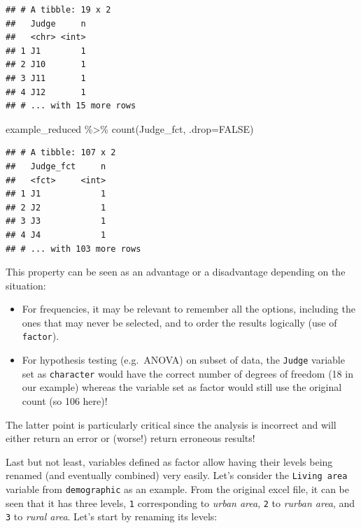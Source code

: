 \documentclass[
]{krantz}
\makeatletter
\newenvironment{Shaded}{\begin{snugshade}}{\end{snugshade}}
\newcommand{\AttributeTok}[1]{\textcolor[rgb]{0.61,0.61,0.61}{#1}}
\newcommand{\ConstantTok}[1]{\textcolor[rgb]{0,0,0}{#1}}
\newcommand{\FunctionTok}[1]{\textcolor[rgb]{0,0,0}{#1}}
\newcommand{\NormalTok}[1]{#1}
\newcommand{\SpecialCharTok}[1]{\textcolor[rgb]{0,0,0}{#1}}
\providecommand{\tightlist}{%
  \setlength{\itemsep}{0pt}\setlength{\parskip}{0pt}}
\newenvironment{kframe}{%
\medskip{}
\setlength{\fboxsep}{.8em}
 \def\at@end@of@kframe{}%
 \ifinner\ifhmode%
  \def\at@end@of@kframe{\end{minipage}}%
  \begin{minipage}{\columnwidth}%
 \fi\fi%
 \def\FrameCommand##1{\hskip\@totalleftmargin \hskip-\fboxsep
 \colorbox{shadecolor}{##1}\hskip-\fboxsep
     \hskip-\linewidth \hskip-\@totalleftmargin \hskip\columnwidth}%
 \MakeFramed {\advance\hsize-\width
   \@totalleftmargin\z@ \linewidth\hsize
   \@setminipage}}%
 {\par\unskip\endMakeFramed%
 \at@end@of@kframe}
\renewenvironment{Shaded}{\begin{kframe}}{\end{kframe}}
\makeatother
\begin{document}
\begin{verbatim}
## # A tibble: 19 x 2
##   Judge     n
##   <chr> <int>
## 1 J1        1
## 2 J10       1
## 3 J11       1
## 4 J12       1
## # ... with 15 more rows
\end{verbatim}

\begin{Shaded}
\begin{Highlighting}[]
\NormalTok{example\_reduced }\SpecialCharTok{\%\textgreater{}\%} 
  \FunctionTok{count}\NormalTok{(Judge\_fct, }\AttributeTok{.drop=}\ConstantTok{FALSE}\NormalTok{)}
\end{Highlighting}
\end{Shaded}

\begin{verbatim}
## # A tibble: 107 x 2
##   Judge_fct     n
##   <fct>     <int>
## 1 J1            1
## 2 J2            1
## 3 J3            1
## 4 J4            1
## # ... with 103 more rows
\end{verbatim}

This property can be seen as an advantage or a disadvantage depending on the situation:

\begin{itemize}
\tightlist
\item
  For frequencies, it may be relevant to remember all the options, including the ones that may never be selected, and to order the results logically (use of \texttt{factor}).
\item
  For hypothesis testing (e.g.~ANOVA) on subset of data, the \texttt{Judge} variable set as \texttt{character} would have the correct number of degrees of freedom (18 in our example) whereas the variable set as factor would still use the original count (so 106 here)!
\end{itemize}

The latter point is particularly critical since the analysis is incorrect and will either return an error or (worse!) return erroneous results!

Last but not least, variables defined as factor allow having their levels being renamed (and eventually combined) very easily.
Let's consider the \texttt{Living\ area} variable from \texttt{demographic} as an example. From the original excel file, it can be seen that it has three levels, \texttt{1} corresponding to \emph{urban area}, \texttt{2} to \emph{rurban area}, and \texttt{3} to \emph{rural area}. Let's start by renaming its levels:
\end{document}
